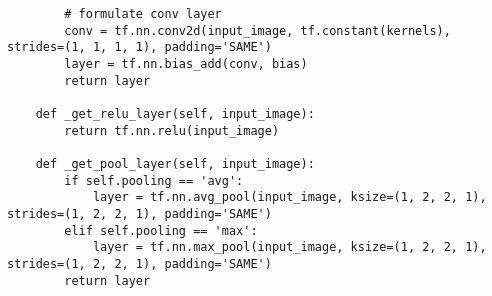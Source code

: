 \begin{spacing}{1.2}
\begin{lstlisting}
        # formulate conv layer
        conv = tf.nn.conv2d(input_image, tf.constant(kernels), strides=(1, 1, 1, 1), padding='SAME')
        layer = tf.nn.bias_add(conv, bias)
        return layer

    def _get_relu_layer(self, input_image):
        return tf.nn.relu(input_image)

    def _get_pool_layer(self, input_image):
        if self.pooling == 'avg':
            layer = tf.nn.avg_pool(input_image, ksize=(1, 2, 2, 1), strides=(1, 2, 2, 1), padding='SAME')
        elif self.pooling == 'max':
            layer = tf.nn.max_pool(input_image, ksize=(1, 2, 2, 1), strides=(1, 2, 2, 1), padding='SAME')
        return layer

\end{lstlisting}
\end{spacing}
